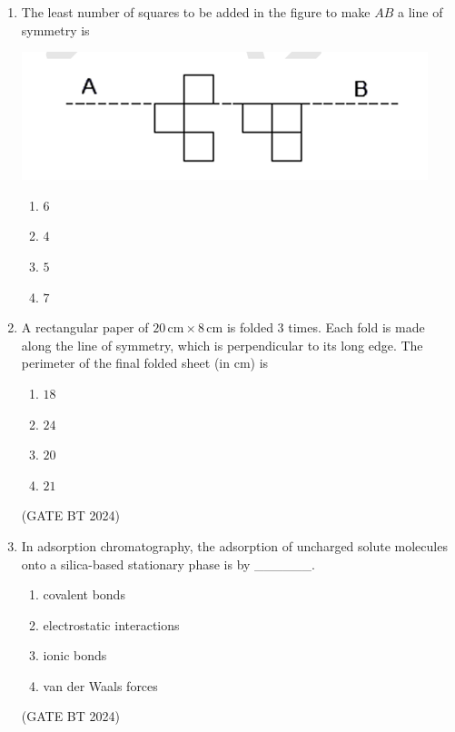 \documentclass[journal,12pt,onecolumn]{IEEEtran}
\theoremstyle{remark}
\begin{document}
\begin{enumerate}
\item The least number of squares to be added in the figure to make $AB$ a line of symmetry is

\begin{center}
\includegraphics[width=\columnwidth]{figs/figure_path.png}
\label{fig:figure_path}
\end{center}

\begin{enumerate}
    \item $6$
    \item $4$
    \item $5$
    \item $7$
\end{enumerate}

\item 
A rectangular paper of $20\,\text{cm} \times 8\,\text{cm}$ is folded $3$ times. Each fold is made along the line of symmetry, which is perpendicular to its long edge. The perimeter of the final folded sheet (in cm) is

\begin{enumerate}
    \item $18$
    \item $24$
    \item $20$
    \item $21$
\end{enumerate}
\hfill(GATE BT 2024)

\item 
In adsorption chromatography, the adsorption of uncharged solute molecules onto a silica-based stationary phase is by \_\_\_\_\_\_.

\begin{enumerate}
    \item covalent bonds
    \item electrostatic interactions
    \item ionic bonds
    \item van der Waals forces
\end{enumerate}
\hfill(GATE BT 2024)


\end{enumerate}
\end{document}
